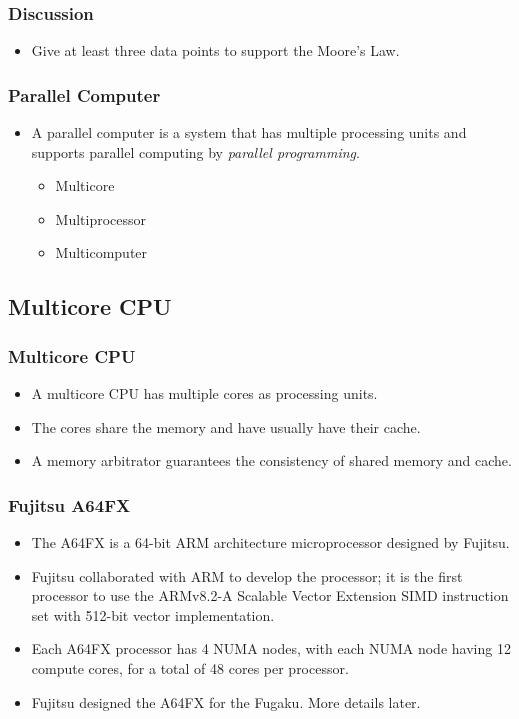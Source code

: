 \documentclass{beamer}
\begin{document}
\begin{CJK}{UTF8}{bsmi}
  \begin{frame}
    \frametitle{Discussion} 
    \begin{itemize}
    \item Give at least three data points to support the Moore's Law.
    \end{itemize}
  \end{frame}


  \begin{frame}
    \frametitle{Parallel Computer} 
    \begin{itemize}
    \item A parallel computer is a system that has multiple processing
      units and supports parallel computing by {\em parallel programming}.
      \begin{itemize}
      \item Multicore
      \item Multiprocessor
      \item Multicomputer
      \end{itemize}
    \end{itemize}
  \end{frame}


  \subsection{Multicore CPU}

  \begin{frame}
    \frametitle{Multicore CPU}
    \begin{itemize}
    \item A multicore CPU has multiple cores as processing units.
    \item The cores share the memory and have usually have their cache.
    \item A memory arbitrator guarantees the consistency of shared memory
      and cache.
    \end{itemize}
  \end{frame}

  \begin{frame}
    \frametitle{Fujitsu A64FX}
    \begin{itemize}
    \item The A64FX is a 64-bit ARM architecture microprocessor designed by Fujitsu.
    \item Fujitsu collaborated with ARM to develop the processor; it is
      the first processor to use the ARMv8.2-A Scalable Vector Extension
      SIMD instruction set with 512-bit vector implementation.
    \item Each A64FX processor has 4 NUMA nodes, with each NUMA node
      having 12 compute cores, for a total of 48 cores per processor.
    \item Fujitsu designed the A64FX for the Fugaku.  More details later.
    \end{itemize}
  \end{frame}




\end{CJK}
\end{document}
